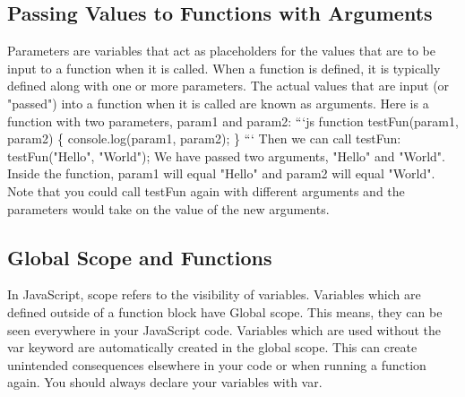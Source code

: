 \documentclass{article}%
\begin{document}
%
\subsection{Passing Values to Functions with Arguments}%
\label{subsec:PassingValuestoFunctionswithArguments}%
Parameters are variables that act as placeholders for the values that are to be input to a function when it is called. When a function is defined, it is typically defined along with one or more parameters. The actual values that are input (or "passed") into a function when it is called are known as arguments.\newline%
Here is a function with two parameters, param1 and param2:\newline%
```js\newline%
function testFun(param1, param2) \{\newline%
  console.log(param1, param2);\newline%
\}\newline%
```\newline%
Then we can call testFun:\newline%
testFun("Hello", "World");\newline%
We have passed two arguments, "Hello" and "World". Inside the function, param1 will equal "Hello" and param2 will equal "World". Note that you could call testFun again with different arguments and the parameters would take on the value of the new arguments.\newline%

%
\subsection{Global Scope and Functions}%
\label{subsec:GlobalScopeandFunctions}%
In JavaScript, scope refers to the visibility of variables. Variables which are defined outside of a function block have Global scope. This means, they can be seen everywhere in your JavaScript code.\newline%
Variables which are used without the var keyword are automatically created in the global scope. This can create unintended consequences elsewhere in your code or when running a function again. You should always declare your variables with var.\newline%

%
\end{document}
